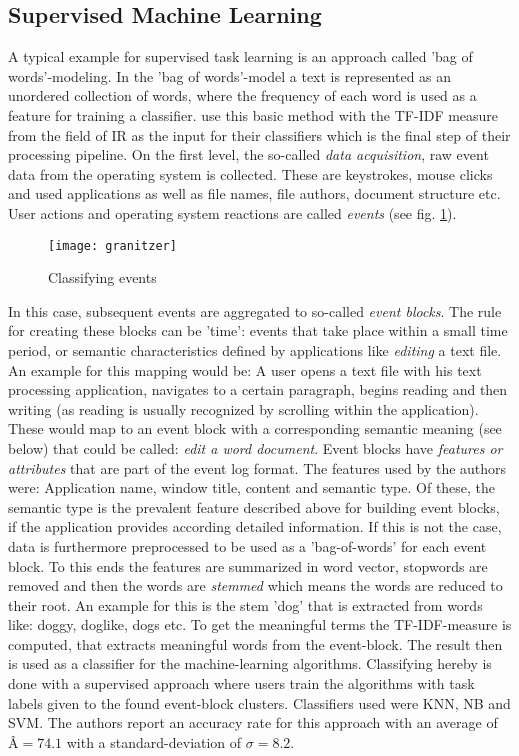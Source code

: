 \subsection{Supervised Machine Learning}
A typical example for supervised task learning is an approach called 'bag of words'-modeling. In the 'bag of words'-model a text is represented as an unordered collection of words, where the frequency of each word is used as a feature for training a classifier. \cite{granitzer2008analysis} use this basic method with the \ac{TF-IDF} measure from the field of \ac{IR} as the input for their classifiers which is the final step of their processing pipeline. On the first level, the so-called \textit{data acquisition}, raw event data from the operating system is collected. These are keystrokes, mouse clicks and used applications as well as file names, file authors, document structure etc. User actions and operating system reactions are called \textit{events} (see fig. \ref{fig2}).  
\begin{figure}[ht]
	\centering
  \texttt{[image: granitzer]}
	\caption{Classifying events}
	\label{fig2}
\end{figure}

In this case, subsequent events are aggregated to so-called \textit{event blocks}. The rule for creating these blocks can be 'time': events that take place within a small time period, or semantic characteristics defined by applications like \textit{editing} a text file. An example for this mapping would be: A user opens a text file with his text processing application, navigates to a certain paragraph, begins reading and then writing (as reading is usually recognized by scrolling within the application). These would map to an event block with a corresponding semantic meaning (see below) that could be called: \textit{edit a word document}. Event blocks have \textit{features or attributes} that are part of the event log format. The features used by the authors were: Application name, window title, content and semantic type. Of these, the semantic type is the prevalent feature described above for building event blocks, if the application provides according detailed information. If this is not the case, data is furthermore preprocessed to be used as a 'bag-of-words' for each event block. To this ends the features are summarized in word vector, stopwords are removed and then the words are \textit{stemmed} which means the words are reduced to their root. An example for this is the stem 'dog' that is extracted from words like: doggy, doglike, dogs etc. To get the meaningful terms the \acs{TF-IDF}-measure is computed, that extracts meaningful words from the event-block. The result then is used as a classifier for the machine-learning algorithms.  Classifying hereby is done with a supervised approach where users train the algorithms with task labels given to the found event-block clusters. Classifiers used were \ac{KNN}, \ac{NB} and \ac{SVM}. The authors report an accuracy rate for this approach with an average of $Â = 74.1$ with a standard-deviation of $\sigma = 8.2$.

